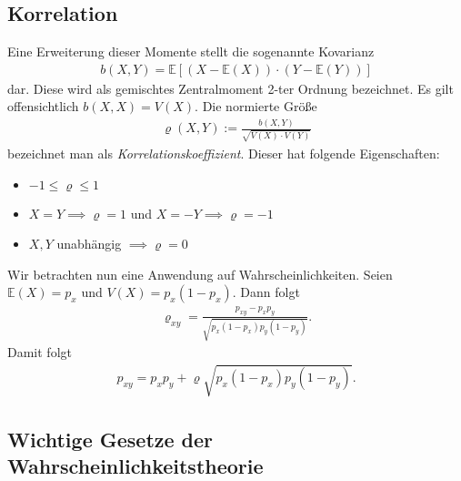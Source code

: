 \documentclass[10pt, a4paper, twoside]{extarticle}
\theoremstyle{nonumberplain}
\theoremstyle{plain}
\begin{document}
\subsection{Korrelation}
Eine Erweiterung dieser Momente stellt die sogenannte Kovarianz \begin{align*}
b(X,Y)=\mathbb{E}[(X-\mathbb{E}(X))\cdot(Y-\mathbb{E}(Y))]
\end{align*}
dar. Diese wird als gemischtes Zentralmoment 2-ter Ordnung bezeichnet. Es gilt offensichtlich $ b(X,X)=V(X) $. Die normierte Größe \begin{align*}
\varrho(X,Y) :=\frac{b(X,Y)}{\sqrt{V(X)\cdot V(Y)}}
\end{align*}
bezeichnet man als \emph{Korrelationskoeffizient}. Dieser hat folgende Eigenschaften:
\begin{itemize}
\item $ -1\leq \varrho\leq 1 $
\item $ X=Y\implies \varrho=1 $ und $ X=-Y\implies \varrho=-1 $
\item $ X,Y $ unabhängig $ \implies \varrho=0 $
\end{itemize}
Wir betrachten nun eine Anwendung auf Wahrscheinlichkeiten. Seien $ \mathbb{E}(X)=p_x $ und $ V(X)=p_x(1-p_x) $. Dann folgt \begin{align*}
\varrho_{xy}=\frac{p_{xy}-p_xp_y}{\sqrt{p_x(1-p_x)p_y(1-p_y)}}.
\end{align*}
Damit folgt \begin{align*}
p_{xy}=p_xp_y+\varrho\sqrt{p_x(1-p_x)p_y(1-p_y)}.
\end{align*}

\subsection{Wichtige Gesetze der Wahrscheinlichkeitstheorie}
\end{document}

